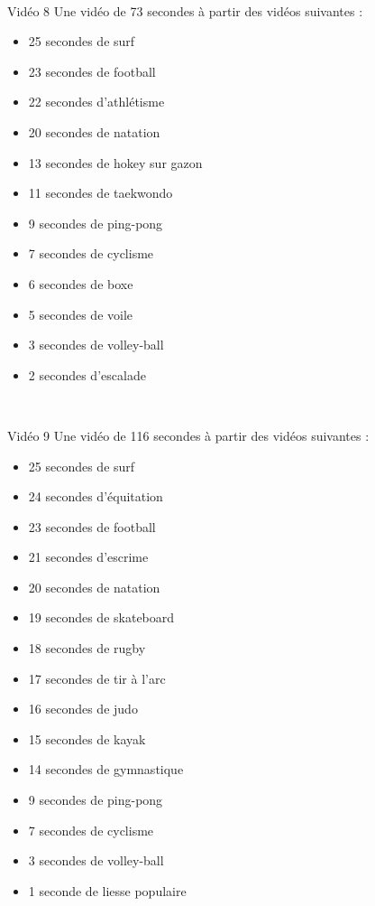 \documentclass[10pt, a5paper,twoside]{article}
\begin{document}
\vfill

\clearpage
~
\vfill

\begin{card}[width = \textwidth, colback = olympicblue, colframe = olympicblue, bottomtitle = 2mm]{Vidéo 8}
  Une vidéo de 73 secondes à partir des vidéos suivantes :
  \vspace{-1mm}\begin{itemize}
    \item 25 secondes de surf
    \item 23 secondes de football
    \item 22 secondes d'athlétisme
    \item 20 secondes de natation
    \item 13 secondes de hokey sur gazon
    \item 11 secondes de taekwondo
    \item 9 secondes de ping-pong
    \item 7 secondes de cyclisme
    \item 6 secondes de boxe
    \item 5 secondes de voile
    \item 3 secondes de volley-ball
    \item 2 secondes d'escalade
  \end{itemize}
\end{card}

\vfill

\clearpage
~
\vfill

\begin{card}[width = \textwidth, colback = olympicblue, colframe = olympicblue, bottomtitle = 2mm]{Vidéo 9}
  Une vidéo de 116 secondes à partir des vidéos suivantes :
  \vspace{-1mm}\begin{itemize}
    \item 25 secondes de surf
    \item 24 secondes d'équitation
    \item 23 secondes de football
    \item 21 secondes d'escrime
    \item 20 secondes de natation
    \item 19 secondes de skateboard
    \item 18 secondes de rugby
    \item 17 secondes de tir à l'arc
    \item 16 secondes de judo
    \item 15 secondes de kayak
    \item 14 secondes de gymnastique
    \item 9 secondes de ping-pong
    \item 7 secondes de cyclisme
    \item 3 secondes de volley-ball
    \item 1 seconde de liesse populaire
  \end{itemize}
\end{card}
\end{document}
